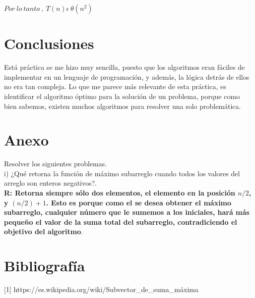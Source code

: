 \documentclass[12pt]{report}
\begin{document}
		$Por \ lo \ tanto \ , \ T(n) \epsilon \ \theta (n^{2})$\newpage

	
\section{Conclusiones}
Está práctica se me hizo muy sencilla, puesto que los algoritmos eran fáciles de implementar en un lenguaje de programación, y además, la lógica detrás de ellos no era tan compleja.\newline
Lo que me parece más relevante de esta práctica, es identificar el algoritmo óptimo para la solución de un problema, porque como bien sabemos, existen muchos algoritmos para resolver una solo problemática.\newpage 


\section{Anexo}

Resolver los siguientes problemas.\\

i) ¿Qué retorna la función de máximo subarreglo cuando todos los valores del arreglo son enteros negativos?.\\

\textbf{R: Retorna siempre sólo dos elementos, el elemento en la posición $n/2$, y $(n/2)+1$. Esto es porque como el se desea obtener el máximo subarreglo, cualquier número que le sumemos a los iniciales, hará más pequeño el valor de la suma total del subarreglo, contradiciendo el objetivo del algoritmo}.\\

\section{Bibliografía}

[1] https://es.wikipedia.org/wiki/Subvector\_de\_suma\_máxima\\
	
\end{document}
